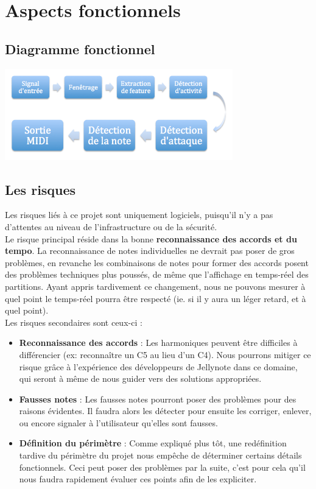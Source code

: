 \documentclass[12pt]{article}
\begin{document}
\newpage
\section{Aspects fonctionnels}

\subsection{Diagramme fonctionnel}
\vspace{1cm}
\includegraphics[height=150px]{diagfunc.png}

\newpage
\subsection{Les risques}

Les risques liés à ce projet sont uniquement logiciels, puisqu’il n’y a pas d’attentes au niveau de l’infrastructure ou de la sécurité.\\

Le risque principal réside dans la bonne \textbf{reconnaissance des accords et du tempo}. La reconnaissance de notes individuelles ne devrait pas poser de gros problèmes, en revanche les combinaisons de notes pour former des accords posent des problèmes techniques plus poussés, de même que l'affichage en temps-réel des partitions. Ayant appris tardivement ce changement, nous ne pouvons mesurer à quel point le temps-réel pourra être respecté (ie. si il y aura un léger retard, et à quel point). \\

Les risques secondaires sont ceux-ci :
\begin{itemize}
\item \textbf{Reconnaissance des accords} : Les harmoniques peuvent être difficiles à différencier (ex: reconnaître un C5 au lieu d’un C4). Nous pourrons mitiger ce risque grâce à l’expérience des développeurs de Jellynote dans ce domaine, qui seront à même de nous guider vers des solutions appropriées.
\item \textbf{Fausses notes} : Les fausses notes pourront poser des problèmes pour des raisons évidentes. Il faudra alors les détecter pour ensuite les corriger, enlever, ou encore signaler à l’utilisateur qu’elles sont fausses.
\item \textbf{Définition du périmètre} : Comme expliqué plus tôt, une redéfinition tardive du périmètre du projet nous empêche de déterminer certains détails fonctionnels. Ceci peut poser des problèmes par la suite, c'est pour cela qu'il nous faudra rapidement évaluer ces points afin de les expliciter.
\end{itemize}
\end{document}

